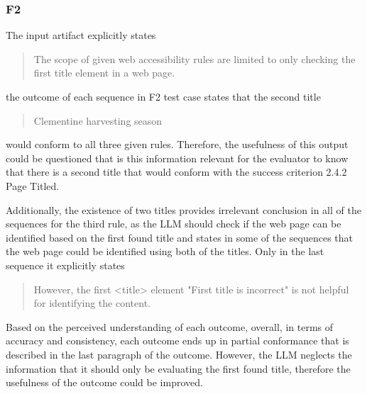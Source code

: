 \subsubsection{F2}

The input artifact explicitly states \blockquote{The scope of given web accessibility rules are limited to only checking the first title element in a web page.} the outcome of each sequence in F2 test case states that the second title \blockquote{Clementine harvesting season} would conform to all three given rules. Therefore, the usefulness of this output could be questioned that is this information relevant for the evaluator to know that there is a second title that would conform with the success criterion 2.4.2 Page Titled.

Additionally, the existence of two titles provides irrelevant conclusion in all of the sequences for the third rule, as the LLM should check if the web page can be identified based on the first found title and states in some of the sequences that the web page could be identified using both of the titles. Only in the last sequence it explicitly states \blockquote{However, the first <title> element "First title is incorrect" is not helpful for identifying the content.}

Based on the perceived understanding of each outcome, overall, in terms of accuracy and consistency, each outcome ends up in partial conformance that is described in the last paragraph of the outcome. However, the LLM neglects the information that it should only be evaluating the first found title, therefore the usefulness of the outcome could be improved.